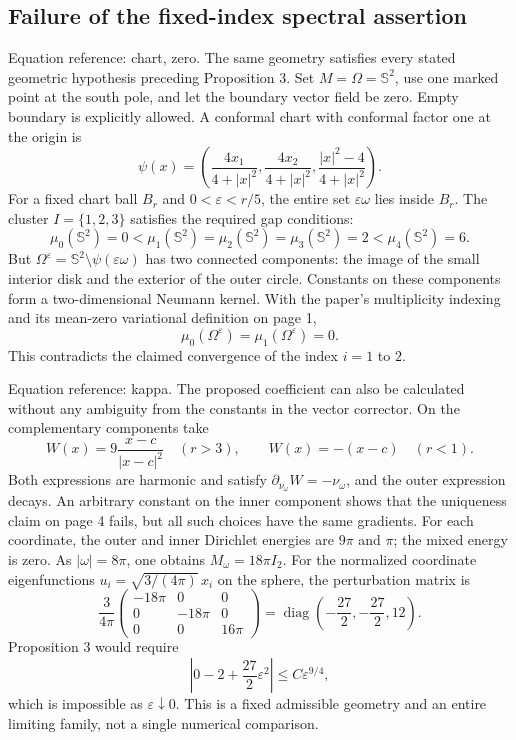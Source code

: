 \documentclass[10pt]{article}
\begin{document}
\subsection*{Failure of the fixed-index spectral assertion}
Equation reference: chart, zero. The same geometry satisfies every stated geometric hypothesis preceding Proposition 3. Set \(M=\Omega=\mathbb S^2\), use one marked point at the south pole, and let the boundary vector field be zero. Empty boundary is explicitly allowed. A conformal chart with conformal factor one at the origin is \[
 \psi(x)=\left(\frac{4x_1}{4+|x|^2},
              \frac{4x_2}{4+|x|^2},
              \frac{|x|^2-4}{4+|x|^2}\right).\] For a fixed chart ball \(B_r\) and \(0<\varepsilon<r/5\), the entire set \(\varepsilon\omega\) lies inside \(B_r\). The cluster \(I=\{1,2,3\}\) satisfies the required gap conditions: \[\mu_0(\mathbb S^2)=0<\mu_1(\mathbb S^2)=\mu_2(\mathbb S^2)
 =\mu_3(\mathbb S^2)=2<\mu_4(\mathbb S^2)=6.\] But \(\Omega^\varepsilon=\mathbb S^2\setminus\psi(\varepsilon\omega)\) has two connected components: the image of the small interior disk and the exterior of the outer circle. Constants on these components form a two-dimensional Neumann kernel. With the paper’s multiplicity indexing and its mean-zero variational definition on page 1, \[
 \mu_0(\Omega^\varepsilon)=\mu_1(\Omega^\varepsilon)=0.\] This contradicts the claimed convergence of the index \(i=1\) to \(2\).\par
Equation reference: kappa. The proposed coefficient can also be calculated without any ambiguity from the constants in the vector corrector. On the complementary components take \[W(x)=9\frac{x-c}{|x-c|^2}\quad(r>3),\qquad
 W(x)=-(x-c)\quad(r<1).\] Both expressions are harmonic and satisfy \(\partial_{\nu_\omega}W=-\nu_\omega\), and the outer expression decays. An arbitrary constant on the inner component shows that the uniqueness claim on page 4 fails, but all such choices have the same gradients. For each coordinate, the outer and inner Dirichlet energies are \(9\pi\) and \(\pi\); the mixed energy is zero. As \(|\omega|=8\pi\), one obtains \(M_\omega=18\pi I_2\). For the normalized coordinate eigenfunctions \(u_i=\sqrt{3/(4\pi)}\,x_i\) on the sphere, the perturbation matrix is \[
 \frac{3}{4\pi}
 \begin{pmatrix}
 -18\pi&0&0\\0&-18\pi&0\\0&0&16\pi
 \end{pmatrix}
 =\operatorname{diag}\left(-\frac{27}{2},-\frac{27}{2},12\right).\] Proposition 3 would require \[\left|0-2+\frac{27}{2}\varepsilon^2\right|\leq C\varepsilon^{9/4},\] which is impossible as \(\varepsilon\downarrow0\). This is a fixed admissible geometry and an entire limiting family, not a single numerical comparison.\par
\end{document}
